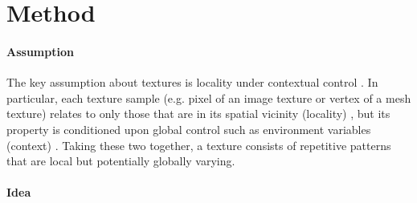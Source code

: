\section{Method}
\label{sec:method}
\label{sec:algorithm}

\paragraph{Assumption}

The key assumption about textures is locality under contextual control \cite{Wei:2009:STTS}.
In particular, each texture sample (e.g. pixel of an image texture or vertex of a mesh texture) relates to only those that are in its spatial vicinity (locality) \cite{Efros:1999:TSN}, but its property is conditioned upon global control such as environment variables (context) \cite{Lu:2007:CT}.
Taking these two together, a texture consists of repetitive patterns that are local but potentially globally varying.

\paragraph{Idea}


